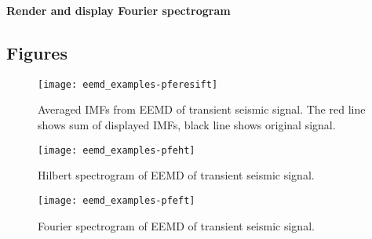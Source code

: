 \documentclass[12pt]{article}
\begin{document}
\textbf{Render and display Fourier spectrogram}

\begin{Schunk}
\end{Schunk}

\subsection{Figures}

\FloatBarrier

\begin{figure}[ht]
\begin{center}
\texttt{[image: eemd\_examples-pferesift]}
\end{center}
\caption{Averaged IMFs from EEMD of transient seismic signal.
The red line shows sum of displayed IMFs, black line shows original signal.}
\label{fig:pferesift}
\end{figure}

\begin{figure}[ht]
\begin{center}
\texttt{[image: eemd\_examples-pfeht]}
\end{center}
\caption{Hilbert spectrogram of EEMD of transient seismic signal.}
\label{fig:pfeht}
\end{figure}

\begin{figure}[ht]
\begin{center}
\texttt{[image: eemd\_examples-pfeft]}
\end{center}
\caption{Fourier spectrogram of EEMD of transient seismic signal.}
\label{fig:pfeft}
\end{figure}
\end{document}
